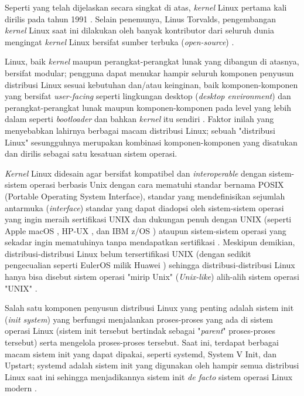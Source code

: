Seperti yang telah dijelaskan secara singkat di atas, \textit{kernel} Linux pertama kali dirilis pada tahun 1991 \cite{tozzi2016linux}. Selain penemunya, Linus Torvalds, pengembangan \textit{kernel} Linux saat ini dilakukan oleh banyak kontributor dari seluruh dunia mengingat \textit{kernel} Linux bersifat sumber terbuka (\textit{open-source}) \cite{entrup2018architecture}.

Linux, baik \textit{kernel} maupun perangkat-perangkat lunak yang dibangun di atasnya, bersifat modular; pengguna dapat menukar hampir seluruh komponen penyusun distribusi Linux sesuai kebutuhan dan/atau keinginan, baik komponen-komponen yang bersifat \textit{user-facing} seperti lingkungan desktop (\textit{desktop environment}) dan perangkat-perangkat lunak maupun komponen-komponen pada level yang lebih dalam seperti \textit{bootloader} dan bahkan \textit{kernel} itu sendiri \cite{zhou2017scalability}. Faktor inilah yang menyebabkan lahirnya berbagai macam distribusi Linux; sebuah "distribusi Linux" sesungguhnya merupakan kombinasi komponen-komponen yang disatukan dan dirilis sebagai satu kesatuan sistem operasi.

\textit{Kernel} Linux didesain agar bersifat kompatibel dan \textit{interoperable} dengan sistem-sistem operasi berbasis Unix dengan cara mematuhi standar bernama POSIX (Portable Operating System Interface), standar yang mendefinisikan sejumlah antarmuka (\textit{interface}) standar yang dapat diadopsi oleh sistem-sistem operasi yang ingin meraih sertifikasi UNIX dan dukungan penuh dengan UNIX (seperti Apple macOS \cite{thierry2022systematic}, HP-UX \cite{hp-ux-unix-certification-certificate}, dan IBM z/OS \cite{ibm-z-os-3-1-unix-certification-certificate}) ataupun sistem-sistem operasi yang sekadar ingin mematuhinya tanpa mendapatkan sertifikasi \cite{atlidakis2016posix}. Meskipun demikian, distribusi-distribusi Linux belum tersertifikasi UNIX (dengan sedikit pengecualian seperti EulerOS milik Huawei \cite{miller2022linux}) sehingga distribusi-distribusi Linux hanya bisa disebut sistem operasi "mirip Unix" (\textit{Unix-like}) alih-alih sistem operasi "UNIX" \cite{adekotujo2020comparative}.

Salah satu komponen penyusun distribusi Linux yang penting adalah sistem init (\textit{init system}) yang berfungsi menjalankan proses-proses yang ada di sistem operasi Linux (sistem init tersebut bertindak sebagai "\textit{parent}" proses-proses tersebut) serta mengelola proses-proses tersebut. Saat ini, terdapat berbagai macam sistem init yang dapat dipakai, seperti systemd, System V Init, dan Upstart; systemd adalah sistem init yang digunakan oleh hampir semua distribusi Linux saat ini sehingga menjadikannya sistem init \textit{de facto} sistem operasi Linux modern \cite{gorauskas2015managing}.

